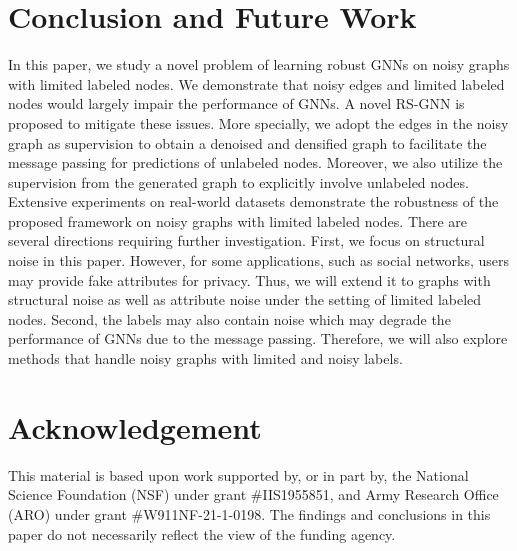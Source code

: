 \section{Conclusion and Future Work}
\label{Sec:conclusion}
In this paper, we study a novel problem of learning robust GNNs on noisy graphs with limited labeled nodes. We demonstrate that noisy edges and limited labeled nodes would largely impair the performance of GNNs. A novel RS-GNN is proposed to mitigate these issues. More specially, we adopt the edges in the noisy graph as supervision to obtain a denoised and densified graph to facilitate the message passing for predictions of unlabeled nodes. Moreover, we also utilize the supervision from the generated graph to explicitly involve unlabeled nodes. Extensive experiments on real-world datasets demonstrate the robustness of the proposed framework on noisy graphs with limited labeled nodes. There are several directions requiring further investigation. First, we focus on structural noise in this paper. However, for some applications, such as social networks, users may provide fake attributes for privacy. Thus, we will extend it to graphs with structural noise as well as attribute noise under the setting of limited labeled nodes. Second, the labels may also contain noise which may degrade the performance of GNNs due to the message passing. Therefore, we will also explore methods that handle noisy graphs with limited and noisy labels. 

\section{Acknowledgement}
This material is based upon work supported by, or in part by, the National Science Foundation (NSF) under grant \#IIS1955851, and Army Research Office (ARO) under grant \#W911NF-21-1-0198. The findings and conclusions in this paper do not necessarily reflect the view of the funding agency. 

